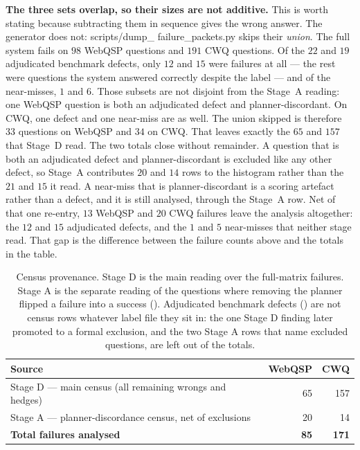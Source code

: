 \textbf{The three sets overlap, so their sizes are not additive.} This is worth
stating because subtracting them in sequence gives the wrong answer. The
generator does not: \textsf{scripts/\allowbreak dump\_\allowbreak
failure\_\allowbreak packets.py} skips their \emph{union}. The full system fails
on $98$ WebQSP questions and $191$ CWQ questions. Of the $22$ and $19$
adjudicated benchmark defects, only $12$ and $15$ were failures at all --- the
rest were questions the system answered correctly despite the label --- and of
the near-misses, $1$ and $6$. Those subsets are not disjoint from the Stage~A
reading: one WebQSP question is both an adjudicated defect and
planner-discordant. On CWQ, one defect and one near-miss are as well. The union
skipped is therefore $33$ questions on WebQSP and $34$ on CWQ. That leaves
exactly the $65$ and $157$ that Stage~D read. The two totals close without
remainder. A question that is both an adjudicated defect and planner-discordant
is excluded like any other defect, so Stage~A contributes $20$ and $14$ rows to
the histogram rather than the $21$ and $15$ it read. A near-miss that is
planner-discordant is a scoring artefact rather than a defect, and it is still
analysed, through the Stage~A row. Net of that one re-entry, $13$ WebQSP and
$20$ CWQ failures leave the analysis altogether: the $12$ and $15$ adjudicated
defects, and the $1$ and $5$ near-misses that neither stage read. That gap is
the difference between the failure counts above and the totals in the table.

\begin{table}[!tb]
  \begin{center}
    \caption[Census provenance]{Census provenance. Stage D is the main reading
    over the full-matrix failures. Stage A is the separate reading of the
    questions where removing the planner flipped a failure into a success
    (). Adjudicated benchmark defects
    () are not census rows whatever label file
    they sit in: the one Stage D finding later promoted to a formal
    exclusion, and the two Stage A rows that name excluded questions, are
    left out of the totals.}
    \label{tab:census-pop}
    \begin{tabular}{|l|r|r|}
      \hline
      \textbf{Source} & \textbf{WebQSP} & \textbf{CWQ} \\
      \hline
      Stage D --- main census (all remaining wrongs and hedges) & 65 & 157 \\
      Stage A --- planner-discordance census, net of exclusions & 20 & 14 \\
      \hline
      \textbf{Total failures analysed} & \textbf{85} & \textbf{171} \\
      \hline
    \end{tabular}
  \end{center}
\end{table}


